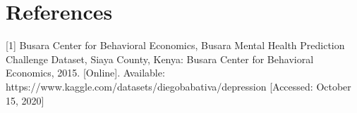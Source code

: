 \documentclass[conference]{IEEEtran}
\begin{document}



\section*{References}
[1] Busara Center for Behavioral Economics, Busara Mental Health Prediction Challenge Dataset, Siaya County, Kenya: Busara Center for Behavioral Economics, 2015. [Online]. Available: https://www.kaggle.com/datasets/diegobabativa/depression [Accessed: October 15, 2020]
\end{document}

